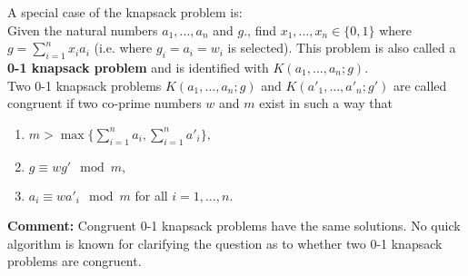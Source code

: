 A special case of the knapsack problem is:\\
Given the natural numbers $ a_1, \dots, a_n $   and $ g .$,
find $ x_1, \dots, x_n \in \{ 0,1\} $  where $ g = \sum_{i=1}^{n}x_i a_i $  
(i.e. where $ g_i = a_i = w_i $ is selected). This problem is also called a  
{\bf 0-1 knapsack problem} and is identified with $ K(a_1, \dots, a_n;g) $.\\

Two 0-1 knapsack problems  $ K(a_1, \dots, a_n;g) $   and  $ K(a'_1, \dots, 
a'_n;g') $  are called congruent if two  co-prime numbers $ w $ 
and $ m $ exist in such a way that
\begin{enumerate}
    \item $ m > \max \{ \sum_{i=1}^n a_i , \sum_{i=1}^n a'_i \}, $

    \item $ g \equiv wg' \mod m, $

    \item $ a_i \equiv w a'_i \mod m $ for all $ i=1, \dots, n.$

\end{enumerate}
 
{\bf Comment:}
Congruent 0-1 knapsack problems have the same solutions.
No quick algorithm is known for clarifying the question as to whether two 0-1
knapsack problems are congruent.

